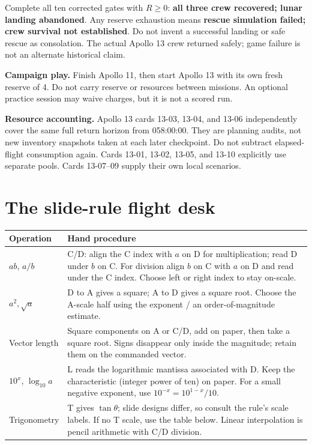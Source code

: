 \documentclass[11pt]{article}
\begin{document}
Complete all ten corrected gates with \(R\geq0\):
\textbf{all three crew recovered; lunar landing abandoned}.
Any reserve exhaustion means \textbf{rescue simulation failed;
crew survival not established}. Do not invent a successful landing or
safe rescue as consolation. The actual Apollo 13 crew returned safely;
game failure is not an alternate historical claim.

\textbf{Campaign play.} Finish Apollo 11, then start Apollo 13 with its
own fresh reserve of 4. Do not carry reserve or resources between missions.
An optional practice session may waive charges, but it is not a scored run.

\textbf{Resource accounting.} Apollo 13 cards 13-03, 13-04, and 13-06
independently cover the same full return horizon from 058:00:00.
They are planning audits, not new inventory snapshots taken at each
later checkpoint. Do not subtract elapsed-flight consumption again.
Cards 13-01, 13-02, 13-05, and 13-10 explicitly use separate pools.
Cards 13-07--09 supply their own local scenarios.

\clearpage
\section*{The slide-rule flight desk}
\begin{tabularx}{\linewidth}{@{}lX@{}}
\toprule
Operation & Hand procedure\\
\midrule
\(ab\), \(a/b\) & C/D: align the C index with \(a\) on D for multiplication;
read D under \(b\) on C. For division align \(b\) on C with \(a\) on D
and read under the C index. Choose left or right index to stay on-scale.\\
\(a^2,\sqrt a\) & D to A gives a square; A to D gives a square root.
Choose the A-scale half using the exponent / an order-of-magnitude estimate.\\
Vector length & Square components on A or C/D, add on paper,
then take a square root. Signs disappear only inside the magnitude;
retain them on the commanded vector.\\
\(10^x\), \(\log_{10}a\) & L reads the logarithmic mantissa associated
with D. Keep the characteristic (integer power of ten) on paper.
For a small negative exponent, use \(10^{-x}=10^{1-x}/10\).\\
Trigonometry & T gives \(\tan\theta\); slide designs differ, so consult
the rule's scale labels. If no T scale, use the table below.
Linear interpolation is pencil arithmetic with C/D division.\\
\bottomrule
\end{tabularx}
\end{document}
